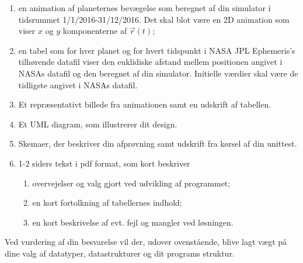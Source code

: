 \documentclass{article}
\begin{document}
\begin{enumerate}[label=11g.\arabic*,start=0]
  \begin{enumerate}
  \item en animation af planeternes bevægelse som beregnet af din simulator i tidsrummet 1/1/2016-31/12/2016. Det skal blot være en 2D animation som viser $x$ og $y$ komponenterne af $\vec{r}(t)$;  
  \item en tabel som for hver planet og for hvert tidspunkt i NASA JPL Ephemeris's tilhørende datafil viser den euklidiske afstand mellem positionen angivet i NASAs datafil og den beregnet af din simulator. Initielle værdier skal være de tidligste angivet i NASAs datafil.
\item Et repræsentativt billede fra animationen samt en udskrift af tabellen.
\item Et UML diagram, som illustrerer dit design.
\item Skemaer, der beskriver din afprøvning samt udskrift fra kørsel af din unittest.
\item 1-2 siders tekst i pdf format, som kort beskriver
  \begin{enumerate}
  \item overvejelser og valg gjort ved udvikling af programmet;
  \item en kort fortolkning af tabellernes indhold;
  \item en kort beskrivelse af evt. fejl og mangler ved løsningen.
\end{enumerate}
\end{enumerate}
Ved vurdering af din besvarelse vil der, udover ovenstående, blive lagt vægt på dine valg af datatyper, datastrukturer og dit programs struktur.



\end{enumerate}
\end{document}
